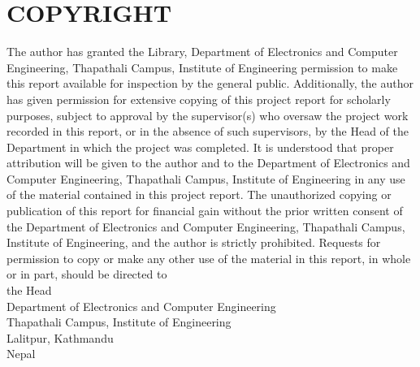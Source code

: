 \newpage
{}
\section*{COPYRIGHT}

The author has granted the Library, Department of Electronics and Computer Engineering, Thapathali Campus, Institute of Engineering permission to make this report available for inspection by the general public. Additionally, the author has given permission for extensive copying of this project report for scholarly purposes, subject to approval by the supervisor(s) who oversaw the project work recorded in this report, or in the absence of such supervisors, by the Head of the Department in which the project was completed. It is understood that proper attribution will be given to the author and to the Department of Electronics and Computer Engineering, Thapathali Campus, Institute of Engineering in any use of the material contained in this project report. The unauthorized copying or publication of this report for financial gain without the prior written consent of the Department of Electronics and Computer Engineering, Thapathali Campus, Institute of Engineering, and the author is strictly prohibited.
Requests for permission to copy or make any other use of the material in this report, in whole or in part, should be directed to\\
the Head \\
Department of Electronics and Computer Engineering \\
Thapathali Campus, Institute of Engineering \\
Lalitpur, Kathmandu \\
Nepal \\
